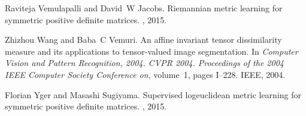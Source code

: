 \documentclass[10pt,onecolumn]{article}
\theoremstyle{definition}
\theoremstyle{definition}
\theoremstyle{definition}
\theoremstyle{definition}
\theoremstyle{definition}
\theoremstyle{theorem}
\newcommand{\0}{{\bm{0}}}
\newcommand{\1}{{\bm{1}}}
\begin{document}
\begin{thebibliography}{10}
Raviteja Vemulapalli and David~W Jacobs.
\newblock Riemannian metric learning for symmetric positive definite matrices.
, 2015.

Zhizhou Wang and Baba~C Vemuri.
\newblock An affine invariant tensor dissimilarity measure and its applications
  to tensor-valued image segmentation.
\newblock In {\em Computer Vision and Pattern Recognition, 2004. CVPR 2004.
  Proceedings of the 2004 IEEE Computer Society Conference on}, volume~1, pages
  I--228. IEEE, 2004.

Florian Yger and Masashi Sugiyama.
\newblock Supervised logeuclidean metric learning for symmetric positive
  definite matrices.
, 2015.

\end{thebibliography}
\end{document}
